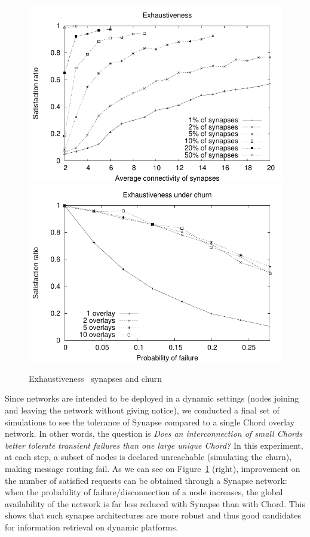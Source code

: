 \begin{figure}[!t]
  \includegraphics[width=0.5\linewidth]{fig/3D-sat.pdf}
  \includegraphics[width=0.5\linewidth]{fig/churn-sat.pdf}
  \caption{Exhaustiveness \vs\ synapses and churn\label{fig:3D-sat}}
\end{figure}
%
Since networks are intended to be deployed in a dynamic settings (nodes
joining and leaving the network without giving notice), we conducted a
final set of simulations to see the tolerance of Synapse compared to a
single Chord overlay network. In other words, the question is
\emph{Does an interconnection of small Chords better tolerate
  transient failures than one large unique Chord?} In this experiment,
at each step, a subset of nodes is declared unreachable (simulating
the churn), making message routing fail. As we can see on
Figure~\ref{fig:3D-sat} (right), improvement on the number of
satisfied requests can be obtained through a Synapse network: when the
probability of failure/disconnection of a node increases, the global
availability of the network is far less reduced with Synapse than with
Chord. This shows that such synapse architectures are more robust and
thus good candidates for information retrieval on dynamic platforms.
 